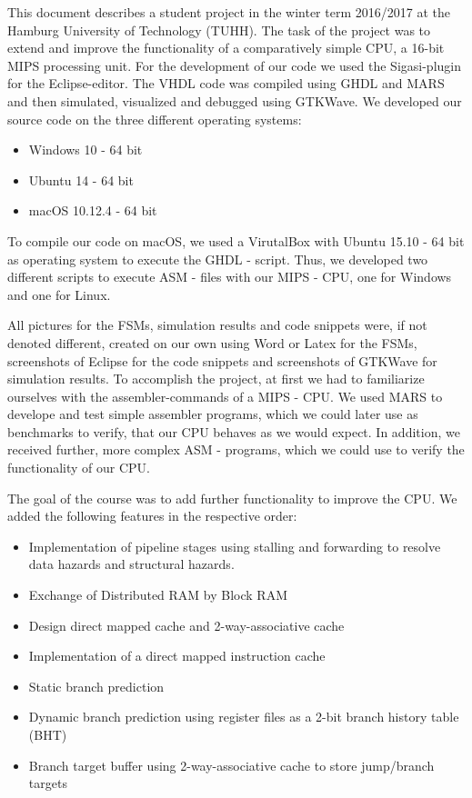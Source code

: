 
This document describes a student project in the winter term 2016/2017 at the Hamburg University of Technology (TUHH). The task of the project was to extend and improve the functionality of a comparatively simple CPU, a 16-bit MIPS processing unit. For the development of our code we used the Sigasi-plugin for the Eclipse-editor. The VHDL code was compiled using GHDL and MARS and then simulated, visualized and debugged using GTKWave. We developed our source code on the three different operating systems:
\begin{itemize}
\item Windows 10 - 64 bit
\item Ubuntu 14 - 64 bit
\item macOS 10.12.4 - 64 bit
\end{itemize}
To compile our code on macOS, we used a VirutalBox with Ubuntu 15.10 - 64 bit as operating system to execute the  GHDL - script. Thus, we developed two different scripts to execute ASM - files with our MIPS - CPU, one for Windows and one for Linux.

All pictures for the FSMs, simulation results and code snippets were, if not denoted different, created on our own using Word or Latex for the FSMs, screenshots of Eclipse for the code snippets and screenshots of GTKWave for simulation results.
To accomplish the project, at first we had to familiarize ourselves with the assembler-commands of a MIPS - CPU. We used MARS to develope and test simple assembler programs, which we could later use as benchmarks to verify, that our CPU behaves as we would expect. In addition, we received further, more complex ASM - programs, which we could use to verify the functionality of our CPU.

The goal of the course was to add further functionality to improve the CPU. We added the following features in the respective order:
\begin{itemize}
\item Implementation of pipeline stages using stalling and forwarding to resolve data hazards and structural hazards.
\item Exchange of Distributed RAM by Block RAM
\item Design direct mapped cache and 2-way-associative cache
\item Implementation of a direct mapped instruction cache
\item Static branch prediction
\item Dynamic branch prediction using register files as a 2-bit branch history table (BHT)
\item Branch target buffer using 2-way-associative cache to store jump/branch targets
\end{itemize}